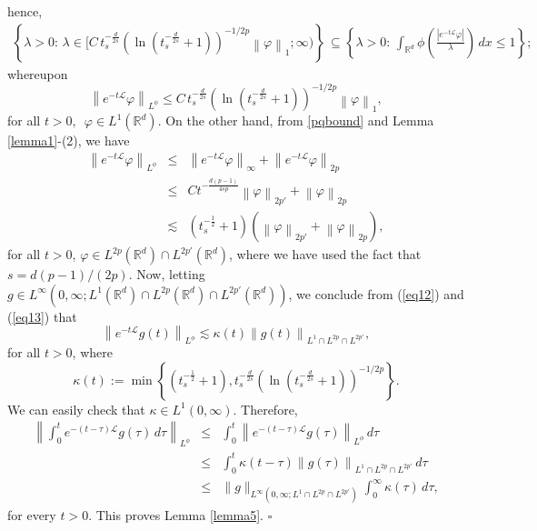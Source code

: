 \documentclass[a4paper,11pt]{amsart}
\numberwithin{equation}{section}
\theoremstyle{plain}
\theoremstyle{definition}
\begin{document}
hence, 
\begin{eqnarray*}
\left\{\lambda>0:\, \lambda\in [ C\,t_s^{-\frac{d}{2 s}}\left(\ln( t_s^{-\frac{d}{2 s}}+1)\right)^{-1/2p}\left\|\varphi\right\|_{1};\infty)\right\}
\,\subseteq \left\{\lambda>0:\, \int_{\mathbb{R}^d}\phi\left(\frac{|e^{-t\mathcal{L}} \varphi|}{\lambda}\right)\,dx\leq 1\right\};
\end{eqnarray*}
whereupon
\begin{equation}\label{eq12}
\left\|e^{-t\mathcal{L}} \varphi\right\|_{L^\phi}\leq C\,t_s^{-\frac{d}{2 s}}\left(\ln( t_s^{-\frac{d}{2 s}}+1)\right)^{-1/2p}\left\|\varphi\right\|_{1},
\end{equation}
for all $t>0,$\, $\varphi\in L^1(\mathbb{R}^d)$. On the other hand, from \ref{pqbound} and Lemma \ref{lemma1}-(2), we have
\begin{eqnarray}\label{eq13}
\left\|e^{-t\mathcal{L}} \varphi\right\|_{L^\phi}&\leq&\left\|e^{-t\mathcal{L}} \varphi\right\|_{\infty}+\left\|e^{-t\mathcal{L}} \varphi\right\|_{2p}\nonumber\\
&\leq& C t^{-\frac{d(p-1)}{4 sp}}\left\|\varphi\right\|_{2p'}+\left\|\varphi\right\|_{2p}\nonumber\\
&\lesssim& (t_s^{-\frac{1}{2}}+1)\left(\left\|\varphi\right\|_{2p'}+\left\|\varphi\right\|_{2p}\right),
\end{eqnarray}
for all $t>0$, $\varphi\in L^{2p}(\mathbb{R}^d)\cap L^{2p'}(\mathbb{R}^d)$, where we have used the fact that $s=d(p-1)/(2 p)$. Now, letting $g\in L^\infty(0,\infty;L^1(\mathbb{R}^d)\cap L^{2p}(\mathbb{R}^d)\cap L^{2p'}(\mathbb{R}^d))$, we conclude from (\ref{eq12}) and (\ref{eq13}) that
$$
\left\|e^{-t\mathcal{L}} g(t)\right\|_{L^\phi}\lesssim \kappa(t) \left\|g(t)\right\|_{L^1\cap L^{2p}\cap L^{2p'}},
$$
for all $t>0$, where
$$\kappa(t) :=\min\left\{(t_s^{-\frac{1}{2}}+1),t_s^{-\frac{d}{2 s}}\left(\ln( t_s^{-\frac{d}{2 s}}+1)\right)^{-1/2p}\right\}.$$
We can easily check that $\kappa\in L^1(0,\infty)$. Therefore,
\begin{eqnarray*}
\left\|\int_0^te^{-(t-\tau)\mathcal{L}} g(\tau)\,d\tau\right\|_{L^\phi}&\leq& \int_0^t\left\|e^{-(t-\tau)\mathcal{L}} g(\tau)\right\|_{L^\phi}\,d\tau\\
&\leq& \int_0^t\kappa(t-\tau)\left\|g(\tau)\right\|_{L^1\cap L^{2p}\cap L^{2p'}}\,d\tau\\
&\leq&\|g\|_{L^\infty(0,\infty;L^1\cap L^{2p}\cap L^{2p'})} \int_0^\infty\kappa(\tau)\,d\tau,
\end{eqnarray*}
for every $t>0$. This proves Lemma \ref{lemma5}. \hfill$\square$\\
\end{document}

